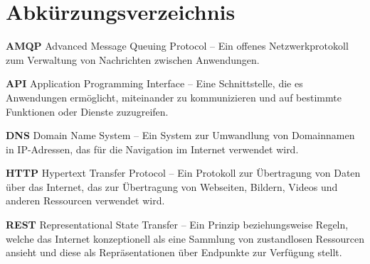 %
%


\nocite{*} %

\listoffigures

\listoftables

\renewcommand\lstlistlistingname{Quellcodeverzeichnis} 
\lstlistoflistings 

\chapter{Abk\"urzungsverzeichnis}

\vspace{3mm}

\textbf{AMQP} Advanced Message Queuing Protocol -- Ein offenes Netzwerkprotokoll zum Verwaltung von Nachrichten zwischen Anwendungen.

\vspace{5mm}

\textbf{API} Application Programming Interface -- Eine Schnittstelle, die es Anwendungen ermöglicht, miteinander zu kommunizieren und auf bestimmte Funktionen oder Dienste zuzugreifen.

\vspace{5mm}

\textbf{DNS} Domain Name System -- Ein System zur Umwandlung von Domainnamen in IP-Adressen, das für die Navigation im Internet verwendet wird.

\vspace{5mm}

\textbf{HTTP} Hypertext Transfer Protocol -- Ein Protokoll zur Übertragung von Daten über das Internet, das zur Übertragung von Webseiten, Bildern, Videos und anderen Ressourcen verwendet wird.

\vspace{5mm}

\textbf{REST} Representational State Transfer -- Ein Prinzip beziehungsweise Regeln, welche das Internet konzeptionell als eine Sammlung von zustandlosen Ressourcen ansieht und diese als Repräsentationen über Endpunkte zur Verfügung stellt.

\vspace{5mm}

